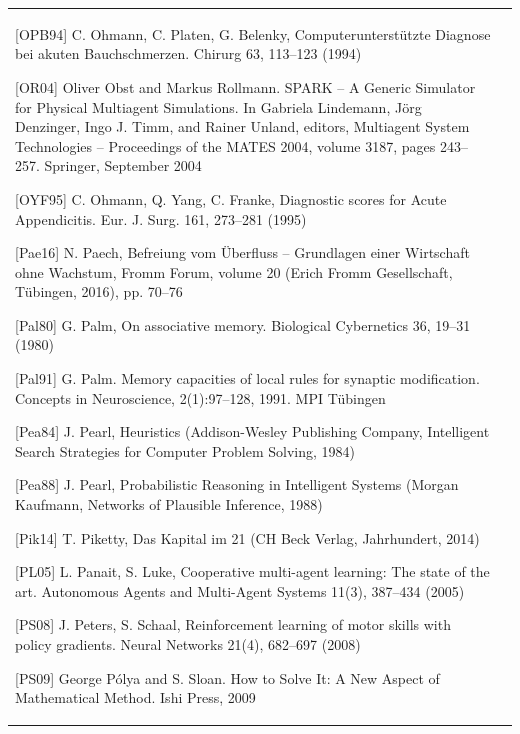\documentclass[10pt]{book}
\begin{document}
\begin{tabular}{|l|l|}
[OPB94] C. Ohmann, C. Platen, G. Belenky, Computerunterstützte Diagnose bei akuten Bauchschmerzen. Chirurg 63, 113–123 (1994)

[OR04] Oliver Obst and Markus Rollmann. SPARK – A Generic Simulator for Physical Multiagent Simulations. In Gabriela Lindemann, Jörg Denzinger, Ingo J. Timm, and Rainer Unland, editors, Multiagent System Technologies – Proceedings of the MATES 2004, volume 3187, pages 243–257. Springer, September 2004

[OYF95] C. Ohmann, Q. Yang, C. Franke, Diagnostic scores for Acute Appendicitis. Eur. J. Surg. 161, 273–281 (1995)

[Pae16] N. Paech, Befreiung vom Überfluss – Grundlagen einer Wirtschaft ohne Wachstum, Fromm Forum, volume 20 (Erich Fromm Gesellschaft, Tübingen, 2016), pp. 70–76

[Pal80] G. Palm, On associative memory. Biological Cybernetics 36, 19–31 (1980)

[Pal91] G. Palm. Memory capacities of local rules for synaptic modification. Concepts in Neuroscience, 2(1):97–128, 1991. MPI Tübingen

[Pea84] J. Pearl, Heuristics (Addison-Wesley Publishing Company, Intelligent Search Strategies for Computer Problem Solving, 1984)

[Pea88] J. Pearl, Probabilistic Reasoning in Intelligent Systems (Morgan Kaufmann, Networks of Plausible Inference, 1988)

[Pik14] T. Piketty, Das Kapital im 21 (CH Beck Verlag, Jahrhundert, 2014)

[PL05] L. Panait, S. Luke, Cooperative multi-agent learning: The state of the art. Autonomous Agents and Multi-Agent Systems 11(3), 387–434 (2005)

[PS08] J. Peters, S. Schaal, Reinforcement learning of motor skills with policy gradients. Neural Networks 21(4), 682–697 (2008)

[PS09] George Pólya and S. Sloan. How to Solve It: A New Aspect of Mathematical Method. Ishi Press, 2009


\end{tabular}
\end{document}
